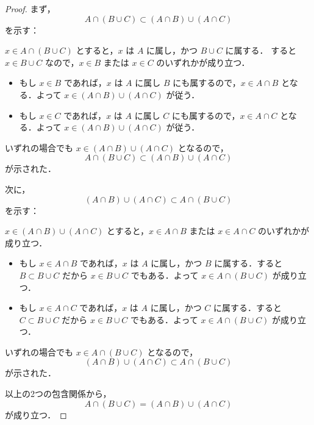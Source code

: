 \begin{tleftbar}
  \begin{proof}
    まず，
    \[
      A \cap (B \cup C) \subset (A \cap B) \cup (A \cap C)
    \]
    を示す：

    $x \in A \cap (B \cup C)$ とすると，$x$ は $A$ に属し，かつ $B \cup C$ に属する．
    すると $x \in B \cup C$ なので，$x \in B$ または $x \in C$ のいずれかが成り立つ．
    \begin{itemize}
      \item もし $x \in B$ であれば，$x$ は $A$ に属し $B$ にも属するので，$x \in A \cap B$ となる．よって $x \in (A \cap B) \cup (A \cap C)$ が従う．
      \item もし $x \in C$ であれば，$x$ は $A$ に属し $C$ にも属するので，$x \in A \cap C$ となる．よって $x \in (A \cap B) \cup (A \cap C)$ が従う．
    \end{itemize}
    いずれの場合でも $x \in (A \cap B) \cup (A \cap C)$ となるので，
    \[
      A \cap (B \cup C) \subset (A \cap B) \cup (A \cap C)
    \]
    が示された．

    次に，
    \[
      (A \cap B) \cup (A \cap C) \subset A \cap (B \cup C)
    \]
    を示す：

    $x \in (A \cap B) \cup (A \cap C)$ とすると，$x \in A \cap B$ または $x \in A \cap C$ のいずれかが成り立つ．
    \begin{itemize}
      \item もし $x \in A \cap B$ であれば，$x$ は $A$ に属し，かつ $B$ に属する．すると $B \subset B \cup C$ だから $x \in B \cup C$ でもある．よって $x \in A \cap (B \cup C)$ が成り立つ．
      \item もし $x \in A \cap C$ であれば，$x$ は $A$ に属し，かつ $C$ に属する．すると $C \subset B \cup C$ だから $x \in B \cup C$ でもある．よって $x \in A \cap (B \cup C)$ が成り立つ．
    \end{itemize}
    いずれの場合でも $x \in A \cap (B \cup C)$ となるので，
    \[
      (A \cap B) \cup (A \cap C) \subset A \cap (B \cup C)
    \]
    が示された．

    以上の2つの包含関係から，
    \[
      A \cap (B \cup C) =(A \cap B) \cup (A \cap C)
    \]
    が成り立つ．
  \end{proof}
\end{tleftbar}

